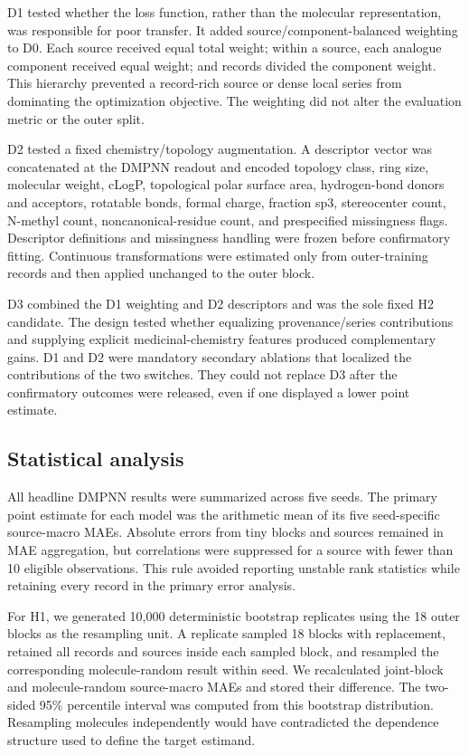 \documentclass[referee,lineno,pdflatex,Numbered,sn-basic]{sn-jnl}
\begin{document}
D1 tested whether the loss function, rather than the molecular representation, was responsible for poor transfer. It added source/component-balanced weighting to D0. Each source received equal total weight; within a source, each analogue component received equal weight; and records divided the component weight. This hierarchy prevented a record-rich source or dense local series from dominating the optimization objective. The weighting did not alter the evaluation metric or the outer split.

D2 tested a fixed chemistry/topology augmentation. A descriptor vector was concatenated at the DMPNN readout and encoded topology class, ring size, molecular weight, cLogP, topological polar surface area, hydrogen-bond donors and acceptors, rotatable bonds, formal charge, fraction sp3, stereocenter count, N-methyl count, noncanonical-residue count, and prespecified missingness flags. Descriptor definitions and missingness handling were frozen before confirmatory fitting. Continuous transformations were estimated only from outer-training records and then applied unchanged to the outer block.

D3 combined the D1 weighting and D2 descriptors and was the sole fixed H2 candidate. The design tested whether equalizing provenance/series contributions and supplying explicit medicinal-chemistry features produced complementary gains. D1 and D2 were mandatory secondary ablations that localized the contributions of the two switches. They could not replace D3 after the confirmatory outcomes were released, even if one displayed a lower point estimate.

\subsection{Statistical analysis}

All headline DMPNN results were summarized across five seeds. The primary point estimate for each model was the arithmetic mean of its five seed-specific source-macro MAEs. Absolute errors from tiny blocks and sources remained in MAE aggregation, but correlations were suppressed for a source with fewer than 10 eligible observations. This rule avoided reporting unstable rank statistics while retaining every record in the primary error analysis.

For H1, we generated 10,000 deterministic bootstrap replicates using the 18 outer blocks as the resampling unit. A replicate sampled 18 blocks with replacement, retained all records and sources inside each sampled block, and resampled the corresponding molecule-random result within seed. We recalculated joint-block and molecule-random source-macro MAEs and stored their difference. The two-sided 95\% percentile interval was computed from this bootstrap distribution. Resampling molecules independently would have contradicted the dependence structure used to define the target estimand.
\end{document}
